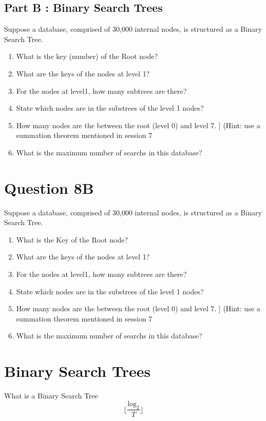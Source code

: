\documentclass[]{report}
\begin{document}
	\subsection*{Part B : Binary Search Trees}
	Suppose a database, comprised of 30,000 internal nodes, is structured as a Binary Search Tree.
	
	\begin{enumerate}
		\item What is the key (number) of the Root node?
		\item What are the keys of the nodes at level 1?
		\item For the nodes at level1, how many subtrees are there?
		\item State which nodes are in the substrees of the level 1 nodes?
		\item How many nodes are the between the root (level 0) and level 7. ]
		(Hint: use a summation theorem mentioned in session 7
		\item What is the maximum number of searchs in this database?
	\end{enumerate}
	
	
	
	
	\section{Question 8B}
	Suppose a database, comprised of 30,000 internal nodes, is structured as a Binary Search Tree.
	
	\begin{enumerate}
		\item What is the Key of the Root node?
		\item What are the keys of the nodes at level 1?
		\item For the nodes at level1, how many subtrees are there?
		\item State which nodes are in the substrees of the level 1 nodes?
		\item How many nodes are the between the root (level 0) and level 7. ]
		(Hint: use a summation theorem mentioned in session 7
		\item What is the maximum number of searchs in this database?
	\end{enumerate}
	
\section*{Binary Search Trees}
What is a Binary Search Tree
\[ \lfloor  \frac{\mbox{log}_2}{T} \rfloor \]
\end{document}
